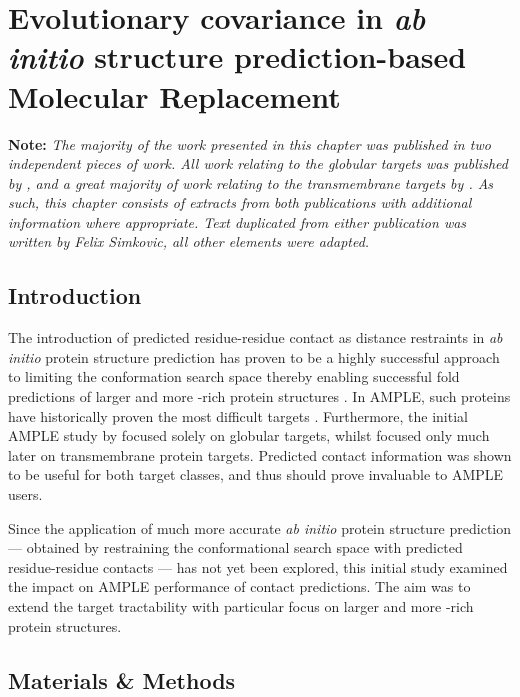 \chapter{Evolutionary covariance in \textit{ab initio} structure prediction-based Molecular Replacement} \label{chap:proof_of_principle}
\clearpage

\textbf{Note: }\textit{The majority of the work presented in this chapter was published in two independent pieces of work. All work relating to the globular targets was published by \textcite{Simkovic2016-wk}, and a great majority of work relating to the transmembrane targets by \textcite{Thomas2017-sh}. As such, this chapter consists of extracts from both publications with additional information where appropriate. Text duplicated from either publication was written by Felix Simkovic, all other elements were adapted.}

\section{Introduction}
The introduction of predicted residue-residue contact as distance restraints in \textit{ab initio} protein structure prediction has proven to be a highly successful approach to limiting the conformation search space thereby enabling successful fold predictions of larger and more \textbeta-rich protein structures \cite[e.g.,][]{Marks2011-os,Michel2014-eg,Kosciolek2014-bt,Ovchinnikov2015-tn,Ovchinnikov2016-jj,Michel2017-xh,De_Oliveira2018-sg,Ovchinnikov2017-nd,Wang2017-rx,Dos_Santos2018-lq}. In AMPLE, such proteins have historically proven the most difficult targets \cite{Bibby2012-lm}. Furthermore, the initial AMPLE study by \textcite{Bibby2012-lm} focused solely on globular targets, whilst \textcite{Thomas2017-qu} focused only much later on transmembrane protein targets. Predicted contact information was shown to be useful for both target classes, and thus should prove invaluable to AMPLE users.

Since the application of much more accurate \textit{ab initio} protein structure prediction --- obtained by restraining the conformational search space with predicted residue-residue contacts --- has not yet been explored, this initial study examined the impact on AMPLE performance of contact predictions. The aim was to extend the target tractability with particular focus on larger and more \textbeta-rich protein structures.

\section{Materials \& Methods} \label{sec:ample_proof_methods}
